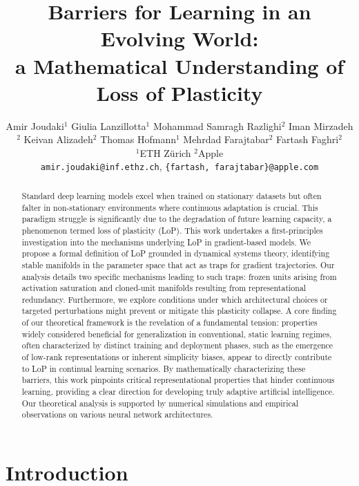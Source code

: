 \documentclass{article}
\title{Barriers for Learning in an Evolving World: \\a Mathematical Understanding of Loss of Plasticity}
\author{%
  Amir Joudaki$^{1}$ \And
  Giulia Lanzillotta$^{1}$ \And
  Mohammad Samragh Razlighi$^{2}$ \And
  Iman Mirzadeh$^{2}$ \And
  Keivan Alizadeh$^{2}$ \And
  Thomas Hofmann$^{1}$ \And
  Mehrdad Farajtabar$^{2}$ \And
  Fartash Faghri$^{2}$ %
  \\
  $^{1}$ETH Zürich \quad
  $^{2}$Apple \\
  \texttt{amir.joudaki@inf.ethz.ch},
  \texttt{\{fartash, farajtabar\}@apple.com}
}
\begin{document}
\maketitle

\begin{abstract}
    Standard deep learning models excel when trained on stationary datasets but often falter in non-stationary environments where continuous adaptation is crucial. This paradigm struggle is significantly due to the degradation of future learning capacity, a phenomenon termed loss of plasticity (LoP). This work undertakes a first-principles investigation into the mechanisms underlying LoP in gradient-based models. We propose a formal definition of LoP grounded in dynamical systems theory, identifying stable manifolds in the parameter space that act as traps for gradient trajectories. Our analysis details two specific mechanisms leading to such traps: frozen units arising from activation saturation and cloned-unit manifolds resulting from representational redundancy. Furthermore, we explore conditions under which architectural choices or targeted perturbations might prevent or mitigate this plasticity collapse. 
    A core finding of our theoretical framework is the revelation of a fundamental tension: properties widely considered beneficial for generalization in conventional, static learning regimes, often characterized by distinct training and deployment phases, such as the emergence of low-rank representations or inherent simplicity biases, appear to directly contribute to LoP in continual learning scenarios. 
    By mathematically characterizing these barriers, this work pinpoints critical representational properties that hinder continuous learning, providing a clear direction for developing truly adaptive artificial intelligence. 
    Our theoretical analysis is supported by numerical simulations and empirical observations on various neural network architectures.
\end{abstract}

\section{Introduction}
\end{document}
